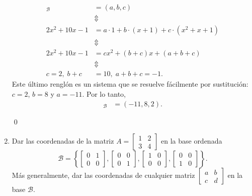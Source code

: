 \begin{enumerate}[topsep=6pt, itemsep=.4cm]
\rta 
\begin{align*}
    [2x^2+10x-1]_{\mathcal{B}}&= (a,b,c) \\
    &\Updownarrow \\
    2x^2+10x-1&=a\cdot 1+b\cdot (x+1)+c\cdot (x^2+x+1) \\
    &\Updownarrow \\
    2x^2+10x-1&=cx^2+(b+c)x+(a+b+c) \\ 
    &\Updownarrow \\
    c=2,\; b+c &= 10, \;a+b+c=-1.
\end{align*}
Este último renglón es un sistema que se resuelve fácilmente por sustitución: $c=2$, $b=8$ y $a=-11$. Por lo tanto,
\begin{align*}
    [2x^2+10x-1]_{\mathcal{B}}&= (-11,8,2).
\end{align*}

\qed


\item Dar las coordenadas de la matriz 
$A=\begin{bmatrix}
    1&2\\3&4 
    \end{bmatrix}
$ en la base ordenada 
$$
\mathcal{B}=\left\{
\begin{bmatrix}
    0&1\\0&0 
    \end{bmatrix},
\begin{bmatrix}
    0&0\\0&1 
    \end{bmatrix},
    \begin{bmatrix}
    1&0\\0&0 
    \end{bmatrix},
    \begin{bmatrix}
    0&0\\1&0 
    \end{bmatrix}
\right\}.
$$
Más generalmente, dar las coordenadas de cualquier matriz $\begin{bmatrix}
    a&b\\c&d 
    \end{bmatrix}$ en la base $\mathcal{B}$.


\end{enumerate}
